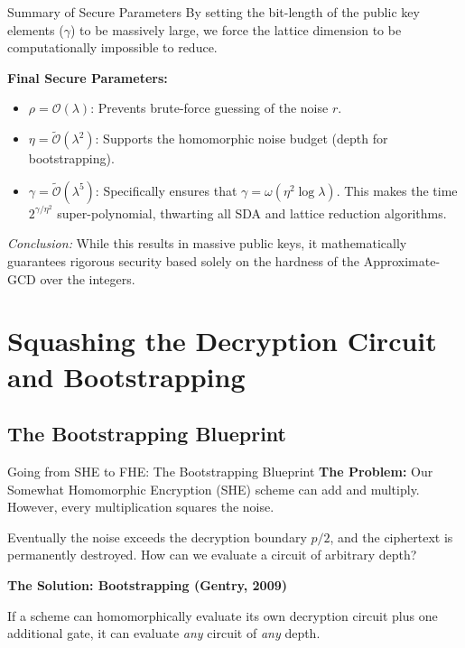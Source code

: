 \documentclass[10pt,handout]{beamer}
\begin{document}
\begin{frame}{Summary of Secure Parameters}
    By setting the bit-length of the public key elements ($\gamma$) to be massively large, we force the lattice dimension to be computationally impossible to reduce. 
    \pause
    
    \vspace{0.3cm}
    \textbf{Final Secure Parameters:}
    \begin{itemize}
        \item $\rho = \mathcal{O}(\lambda)$: Prevents brute-force guessing of the noise $r$.
        \item $\eta = \tilde{\mathcal{O}}(\lambda^2)$: Supports the homomorphic noise budget (depth for bootstrapping).
        \item $\gamma = \tilde{\mathcal{O}}(\lambda^5)$: Specifically ensures that $\gamma = \omega(\eta^2 \log \lambda)$. This makes the time $2^{\gamma / \eta^2}$ super-polynomial, thwarting all SDA and lattice reduction algorithms.
    \end{itemize}
    \pause
    
    \vspace{0.3cm}
    \textit{Conclusion:} While this results in massive public keys, it mathematically guarantees rigorous security based solely on the hardness of the Approximate-GCD over the integers.
\end{frame}

\section{Squashing the Decryption Circuit and Bootstrapping}

\subsection{The Bootstrapping Blueprint}

\begin{frame}{Going from SHE to FHE: The Bootstrapping Blueprint}
    \textbf{The Problem:}
    Our Somewhat Homomorphic Encryption (SHE) scheme can add and multiply.
    However, every multiplication squares the noise.
    \pause

    \vspace{0.3cm}
    Eventually the noise exceeds the decryption boundary $p/2$, and the
    ciphertext is permanently destroyed.
    How can we evaluate a circuit of arbitrary depth?
    \pause

    \vspace{0.3cm}
    \textbf{The Solution: Bootstrapping (Gentry, 2009)}

    If a scheme can homomorphically evaluate its own decryption circuit
    plus one additional gate, it can evaluate \emph{any} circuit of
    \emph{any} depth.
\end{frame}
\end{document}
